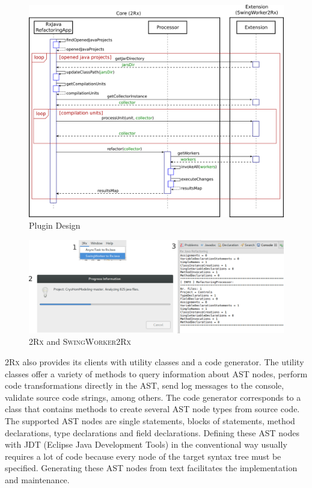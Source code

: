 \documentclass[type=bsc,accentcolor=tud9c]{tudthesis}
\newcommand{\toolcore}{\textsc{2Rx}}
\newcommand{\toolextension}{\textsc{SwingWorker2Rx}}
\begin{document}
\begin{figure}[h]
\begin{center}
\includegraphics[width=15cm]{design/plugin-design.png}
\end{center}
\caption{Plugin Design}
\label{fig:plugin-design}
\end{figure}

\begin{figure}[H]
\begin{center}
\includegraphics[width=15cm]{design/tool-ui.png}
\end{center}
\caption{\toolcore{} and \toolextension{}}
\label{fig:tool-ui}
\end{figure}

\toolcore{} also provides its clients with utility classes and a code generator. The utility classes offer a variety of methods to query information about AST nodes, perform code transformations directly in the AST, send log messages to the console, validate source code strings, among others. The code generator corresponds to a class that contains methods to create several AST node types from source code. The supported AST nodes are single statements, blocks of statements, method declarations, type declarations and field declarations. Defining these AST nodes with JDT (Eclipse Java Development Tools) in the conventional way usually requires a lot of code because every node of the target syntax tree must be specified. Generating these AST nodes from text facilitates the implementation and maintenance.
\end{document}
